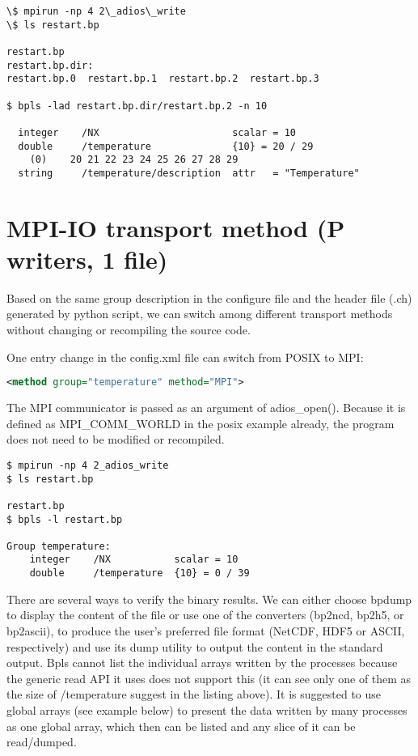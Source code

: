 \begin{lstlisting}[]
\$ mpirun -np 4 2\_adios\_write
\$ ls restart.bp

restart.bp
restart.bp.dir:
restart.bp.0  restart.bp.1  restart.bp.2  restart.bp.3

$ bpls -lad restart.bp.dir/restart.bp.2 -n 10
 
  integer    /NX                       scalar = 10 
  double     /temperature              {10} = 20 / 29 
    (0)    20 21 22 23 24 25 26 27 28 29 
  string     /temperature/description  attr   = "Temperature"
\end{lstlisting}

\section{MPI-IO transport method (P writers, 1 file)}

Based on the same group description in the configure file and the header file (.ch) 
generated by python script, we can switch among different transport methods without 
changing or recompiling the source code.

One entry change in the config.xml file can switch from POSIX to MPI:

\begin{lstlisting}[language=XML]
<method group="temperature" method="MPI">
\end{lstlisting}

The MPI communicator is passed as an argument of adios\_open(). Because it is defined 
as MPI\_COMM\_WORLD in the posix example already, the program does not need to 
be modified or recompiled.

\begin{lstlisting}
$ mpirun -np 4 2_adios_write
$ ls restart.bp

restart.bp
$ bpls -l restart.bp

Group temperature:
    integer    /NX           scalar = 10 
    double     /temperature  {10} = 0 / 39
\end{lstlisting}

There are several ways to verify the binary results. We can either choose bpdump 
to display the content of the file or use one of the converters (bp2ncd, bp2h5, 
or bp2ascii), to produce the user's preferred file format (NetCDF, HDF5 or ASCII, 
respectively) and use its dump utility to output the content in the standard output. 
Bpls cannot list the individual arrays written by the processes because the generic 
read API it uses does not support this (it can see only one of them as the size 
of /temperature suggest in the listing above). It is suggested to use global arrays 
(see example below) to present the data written by many processes as one global 
array, which then can be listed and any slice of it can be read/dumped. 

